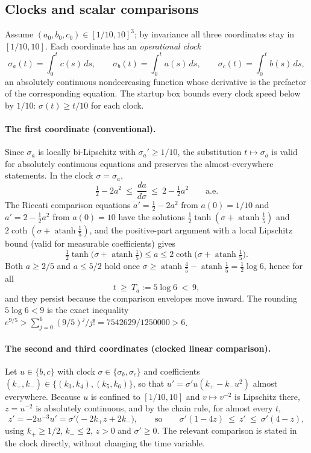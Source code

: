 \documentclass[11pt]{article}
\theoremstyle{definition}
\theoremstyle{remark}
\DeclareMathOperator{\atanh}{atanh}
\DeclareMathOperator{\cothh}{coth}
\begin{document}
\subsection{Clocks and scalar comparisons}\label{sec:comparisons}
Assume $(a_0,b_0,c_0)\in[1/10,10]^3$; by invariance all three coordinates stay in
$[1/10,10]$. Each coordinate has an \emph{operational clock}
\[
 \sigma_a(t)=\int_0^t c(s)\,ds,\qquad \sigma_b(t)=\int_0^t a(s)\,ds,\qquad
 \sigma_c(t)=\int_0^t b(s)\,ds,
\]
an absolutely continuous nondecreasing function whose derivative is the prefactor
of the corresponding equation. The startup box bounds every clock speed below by
$1/10$: $\sigma(t)\ge t/10$ for each clock.

\paragraph{The first coordinate (conventional).}
Since $\sigma_a$ is locally bi-Lipschitz with $\sigma_a'\ge1/10$, the substitution
$t\mapsto\sigma_a$ is valid for absolutely continuous equations and preserves the
almost-everywhere statements. In the clock $\sigma=\sigma_a$,
\[
 \tfrac12-2a^2\ \le\ \frac{da}{d\sigma}\ \le\ 2-\tfrac12a^2\qquad\text{a.e.}
\]
The Riccati comparison equations $a'=\frac12-2a^2$ from $a(0)=1/10$ and
$a'=2-\frac12a^2$ from $a(0)=10$ have the solutions
$\frac12\tanh(\sigma+\atanh\frac15)$ and $2\cothh(\sigma+\atanh\frac15)$, and the
positive-part argument with a local Lipschitz bound (valid for measurable
coefficients) gives
\begin{equation}\label{eq:aenvelopes}
 \tfrac12\tanh\bigl(\sigma+\atanh\tfrac15\bigr)\le a\le2\cothh\bigl(\sigma+\atanh\tfrac15\bigr).
\end{equation}
Both $a\ge2/5$ and $a\le5/2$ hold once $\sigma\ge\atanh\frac45-\atanh\frac15=\frac12\log6$,
hence for all
\begin{equation}\label{eq:Ta}
 t\ \ge\ T_a:=5\log6\ <\ 9,
\end{equation}
and they persist because the comparison envelopes move inward. The rounding
$5\log6<9$ is the exact inequality $e^{9/5}>\sum_{j=0}^{6}(9/5)^j/j!=7542629/1250000>6$.

\paragraph{The second and third coordinates (clocked linear comparison).}
Let $u\in\{b,c\}$ with clock $\sigma\in\{\sigma_b,\sigma_c\}$ and coefficients
$(k_+,k_-)\in\{(k_3,k_4),(k_5,k_6)\}$, so that $u'=\sigma'u(k_+-k_-u^2)$ almost
everywhere. Because $u$ is confined to $[1/10,10]$ and $v\mapsto v^{-2}$ is
Lipschitz there, $z=u^{-2}$ is absolutely continuous, and by the chain rule, for
almost every $t$,
\begin{equation}\label{eq:zode}
 z'=-2u^{-3}u'=\sigma'\bigl(-2k_+z+2k_-\bigr),\qquad\text{so}\qquad
 \sigma'(1-4z)\ \le\ z'\ \le\ \sigma'(4-z),
\end{equation}
using $k_+\ge1/2$, $k_-\le2$, $z>0$ and $\sigma'\ge0$. The relevant comparison is
stated in the clock directly, without changing the time variable.
\end{document}

